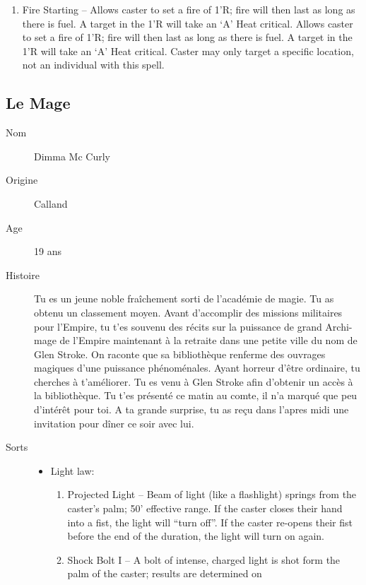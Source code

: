 \documentclass[oneside,12pt]{book}
\begin{document}
\begin{flushleft}
\begin{description}
{\begin{itemize}
\begin{enumerate}
running water, exposed groundwater, etc. exceeding 1
gallon; learns approximate size and quality of source.
\item Fire Starting – Allows caster to set a fire of 1’R; fire will
then last as long as there is fuel. A target in the 1’R will
take an ‘A’ Heat critical. Allows caster to set a fire of 1’R;
fire will then last as long as there is fuel. A target in the
1’R will take an ‘A’ Heat critical. Caster may only target a
specific location, not an individual with this spell.
\end{enumerate}
\end{itemize}
}
\end{description}
\clearpage
\subsection{Le Mage}
\begin{description}
\item[Nom]{Dimma Mc Curly}
\item[Origine]{Calland}
\item[Age]{19 ans}
\item[Histoire]{
\small Tu es un jeune noble fraîchement sorti de l'académie de magie. Tu as obtenu un classement moyen. Avant d'accomplir des missions militaires pour l'Empire, tu t'es souvenu des récits sur la puissance de grand Archi-mage de l'Empire maintenant à la retraite dans une petite ville du nom de Glen Stroke. On raconte que sa bibliothèque renferme des ouvrages magiques d'une puissance phénoménales.  Ayant horreur d'être ordinaire, tu cherches à t'améliorer. Tu es venu à Glen Stroke afin d'obtenir un accès à la bibliothèque. Tu t'es présenté ce matin au comte, il n'a marqué que peu d'intérêt pour toi. A ta grande surprise, tu as reçu dans l'apres midi une invitation pour dîner ce soir avec lui. }
\item[Sorts]{
\begin{itemize}
\item Light law:
\begin{enumerate}
\scriptsize
\item Projected Light – Beam of light (like a flashlight)
springs from the caster’s palm; 50' effective range. If
the caster closes their hand into a fist, the light will
“turn off”. If the caster re-opens their fist before the
end of the duration, the light will turn on again.
\item  Shock Bolt I – A bolt of intense, charged light is shot
form the palm of the caster; results are determined on

\end{enumerate}
\end{itemize}}
\end{description}
\end{flushleft}
\end{document}
